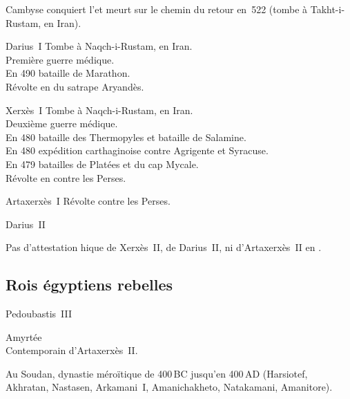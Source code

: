 
Cambyse conquiert l'\kmt et meurt sur le chemin du retour en~522 
(tombe à Takht-i-Rustam, en Iran).

\begin{listerois}
  \item [Darius~I\ier \datation{(522-485)}] 
        Tombe à Naqch-i-Rustam, en Iran. \\
        Première guerre médique. \\
        En 490 bataille de Marathon. \\
        Révolte en \kmt du satrape Aryandès.
  \item [Xerxès~I\ier \datation{(485-464)}] 
        Tombe à Naqch-i-Rustam, en Iran. \\
        Deuxième guerre médique. \\
        En 480 bataille des Thermopyles et bataille de Salamine. \\
        En 480 expédition carthaginoise contre Agrigente et 
        Syracuse. \\
        En 479 batailles de Platées et du cap Mycale. \\
        Révolte en \kmt contre les Perses.
  \item [Artaxerxès~I\ier \datation{(464-424)}]  
        Révolte contre les Perses.
  \item [Darius~II \datation{(424-404)}] 
\end{listerois}

Pas d'attestation h\iero ique de Xerxès~II, de Darius~II, ni 
d'Artaxerxès~II en \kmt.

\subsection{Rois égyptiens rebelles}

\begin{listerois}
  \item [Pedoubastis~III]
  \item [Amyrtée \datation{(404-398)}]  \\
        Contemporain d'Artaxerxès~II.
\end{listerois}

Au Soudan, dynastie méroïtique de 400\,BC jusqu'en 400\,AD (Harsiotef, 
Akhratan, Nastasen, Arkamani~I\ier, Amanichakheto, Natakamani, 
Amanitore).

\subsection{\texorpdfstring{}{XXIXe dynastie}}


